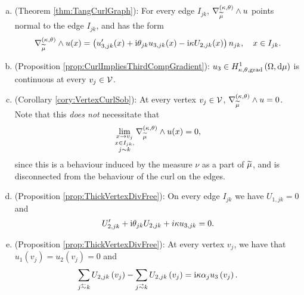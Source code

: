 \begin{enumerate}[(a)]
	\item (Theorem \ref{thm:TangCurlGraph}): For every edge $I_{jk}$, $\nabla_{\widetilde{\mu}}^{\left( \kappa, \theta \right)}\wedge u$ points normal to the edge $I_{jk}$, and has the form
	\begin{align*}
		\nabla_{\widetilde{\mu}}^{\left( \kappa, \theta \right)}\wedge u(x) = \left(  u'_{3,jk}(x) + \mathrm{i}\theta_{jk} u_{3,jk}(x) - \mathrm{i}\kappa U_{2,jk}(x)  \right) n_{jk}, \quad x\in I_{jk}.
	\end{align*}
	\item (Proposition \ref{prop:CurlImpliesThirdCompGradient}): $u_3\in H^1_{\kappa,\theta,\mathrm{grad}}\left( \Omega, \mathrm{d}\mu \right)$ is continuous at every $v_j\in\mathcal{V}$.
	\item (Corollary \ref{cory:VertexCurlSob}): At every vertex $v_j\in\mathcal{V}$, $\nabla_{\widetilde{\mu}}^{\left( \kappa, \theta \right)}\wedge u = 0$.
	Note that this \emph{does not} necessitate that
	\begin{align*}
		\lim_{\substack{x\rightarrow v_j \\ x\in I_{jk}, \\ j\sim k}}\nabla_{\widetilde{\mu}}^{\left( \kappa, \theta \right)}\wedge u(x) = 0,
	\end{align*}
	since this is a behaviour induced by the measure $\nu$ as a part of $\widetilde{\mu}$, and is disconnected from the behaviour of the curl on the edges.
	\item (Proposition \ref{prop:ThickVertexDivFree}): On every edge $I_{jk}$ we have $U_{1,jk}=0$ and
	\begin{align*}
		U'_{2,jk} + \mathrm{i}\theta_{jk} U_{2,jk} + i\kappa u_{3,jk} = 0.
	\end{align*}
	\item (Proposition \ref{prop:ThickVertexDivFree}): At every vertex $v_j$, we have that $u_1(v_j) = u_2(v_j) = 0$ and
	\begin{align*}
		\sum_{j\conRight k} U_{2,jk}\bracs{v_j} - \sum_{j\conLeft k} U_{2,jk}\bracs{v_j} = \rmi\wavenumber\alpha_j u_3\bracs{v_j}.
	\end{align*}
\end{enumerate}

